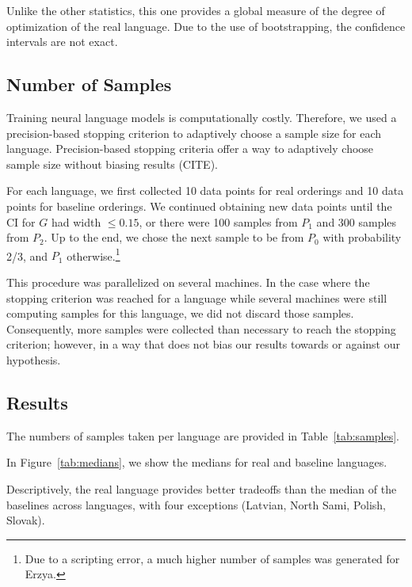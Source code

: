 \documentclass[11pt,letterpaper]{article}
\begin{document}
Unlike the other statistics, this one provides a global measure of the degree of optimization of the real language.
Due to the use of bootstrapping, the confidence intervals are not exact.


%



\subsection{Number of Samples}
Training neural language models is computationally costly.
Therefore, we used a precision-based stopping criterion to adaptively choose a sample size for each language.
Precision-based stopping criteria offer a way to adaptively choose sample size without biasing results (CITE).

For each language, we first collected 10 data points for real orderings and 10 data points for baseline orderings.
We continued obtaining new data points until the CI for $G$ had width $\leq 0.15$, or there were 100 samples from $P_1$ and 300 samples from $P_2$.
Up to the end, we chose the next sample to be from $P_0$ with probability 2/3, and $P_1$ otherwise.\footnote{Due to a scripting error, a much higher number of samples was generated for Erzya.}

This procedure was parallelized on several machines.
In the case where the stopping criterion was reached for a language while several machines were still computing samples for this language, we did not discard those samples.
Consequently, more samples were collected than necessary to reach the stopping criterion; however, in a way that does not bias our results towards or against our hypothesis.




\subsection{Results}

The numbers of samples taken per language are provided in Table~\ref{tab:samples}.


In Figure~\ref{tab:medians}, we show the medians for real and baseline languages.

Descriptively, the real language provides better tradeoffs than the median of the baselines across languages, with four exceptions (Latvian, North Sami, Polish, Slovak).
\end{document}
